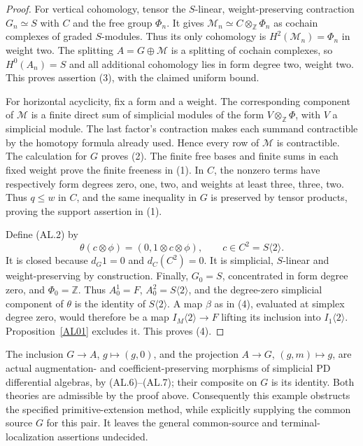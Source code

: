 \begin{proof}
For vertical cohomology, tensor the $S$-linear,
weight-preserving contraction $G_n\simeq S$ with $C$ and the
free group $\Phi_n$.  It gives
$\mathcal M_n\simeq C\otimes_{\mathbb Z}\Phi_n$ as cochain
complexes of graded $S$-modules.  Thus its only cohomology is
$H^2(\mathcal M_n)=\Phi_n$ in weight two.
The splitting $A=G\oplus\mathcal M$ is a splitting of
cochain complexes, so $H^0(A_n)=S$ and all additional
cohomology lies in form degree two, weight two.  This proves
assertion (3), with the claimed uniform bound.

For horizontal acyclicity, fix a form and a weight.  The
corresponding component of $\mathcal M$ is a finite direct
sum of simplicial modules of the form
$V\otimes_{\mathbb Z}\Phi$, with $V$ a simplicial module.
The last factor's contraction makes each summand
contractible by the homotopy formula already used.
Hence every row of $\mathcal M$ is contractible.
The calculation for $G$ proves (2).
The finite free bases and finite sums in each fixed weight
prove the finite freeness in (1).
In $C$, the nonzero terms have respectively form degrees
zero, one, two, and weights at least three, three, two.
Thus $q\leq w$ in $C$, and the same inequality in $G$
is preserved by tensor products, proving the support
assertion in (1).

Define \textup{(AL.2)} by
\[
 \theta(c\otimes\phi)=(0,1\otimes c\otimes\phi),
 \qquad c\in C^2=S\langle2\rangle .
 \tag{AL.8}
\]
It is closed because $d_G1=0$ and $d_C(C^2)=0$.
It is simplicial, $S$-linear and weight-preserving by
construction.  Finally, $G_0=S$, concentrated in form
degree zero, and $\Phi_0=\mathbb Z$.  Thus $A_0^1=F$,
$A_0^2=S\langle2\rangle$, and the degree-zero simplicial
component of $\theta$ is the identity of $S\langle2\rangle$.
A map $\beta$ as in (4), evaluated at simplex degree zero,
would therefore be a map
$I_M\langle2\rangle\to F$ lifting its inclusion into
$I_1\langle2\rangle$.  Proposition~\ref{AL01} excludes it.
This proves (4).
\end{proof}

The inclusion $G\to A$, $g\mapsto(g,0)$, and the projection
$A\to G$, $(g,m)\mapsto g$, are actual augmentation- and
coefficient-preserving morphisms of simplicial PD differential
algebras, by \textup{(AL.6)--(AL.7)}; their composite on $G$
is its identity.  Both theories are admissible by the proof
above.  Consequently this example obstructs the specified
primitive-extension method, while explicitly supplying the
common source $G$ for this pair.  It leaves the general
common-source and terminal-localization assertions undecided.

